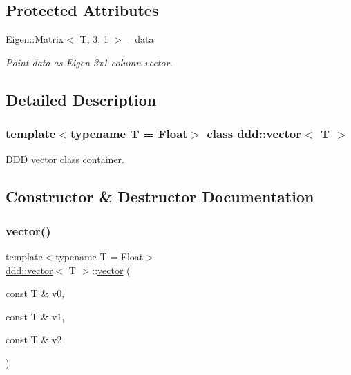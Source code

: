 \subsection*{Protected Attributes}
\begin{DoxyCompactItemize}
\item 
\mbox{\label{classddd_1_1point_af4781a60e5c93aeaaab5c66add25b991}} 
Eigen\+::\+Matrix$<$ T, 3, 1 $>$ \hyperlink{classddd_1_1point_af4781a60e5c93aeaaab5c66add25b991}{\+\_\+data}
\begin{DoxyCompactList}\small\item\em Point data as Eigen 3x1 column vector. \end{DoxyCompactList}\end{DoxyCompactItemize}


\subsection{Detailed Description}
\subsubsection*{template$<$typename T = Float$>$\newline
class ddd\+::vector$<$ T $>$}

D\+DD vector class container. 

\subsection{Constructor \& Destructor Documentation}
\mbox{\label{classddd_1_1vector_a8339300bbb7433f4988b2aebeef90599}} 
\subsubsection{\texorpdfstring{vector()}{vector()}\hspace{0.1cm}{\footnotesize\ttfamily [1/2]}}
{\footnotesize\ttfamily template$<$typename T = Float$>$ \\
\hyperlink{classddd_1_1vector}{ddd\+::vector}$<$ T $>$\+::\hyperlink{classddd_1_1vector}{vector} (\begin{DoxyParamCaption}\item[{const T \&}]{v0,  }\item[{const T \&}]{v1,  }\item[{const T \&}]{v2 }\end{DoxyParamCaption})\hspace{0.3cm}{\ttfamily [inline]}}



